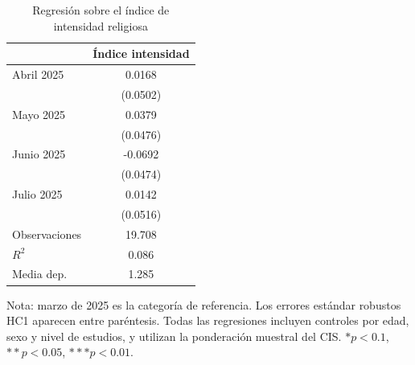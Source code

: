 \begin{table}[H]
\centering
\caption{Regresión sobre el índice de intensidad religiosa}
\label{tab:intensidad-completa}
\small
\begin{tabular}{lc}
\hline
 & Índice intensidad \\
\hline
Abril 2025 & 0.0168 \\
 & (0.0502) \\
Mayo 2025 & 0.0379 \\
 & (0.0476) \\
Junio 2025 & -0.0692 \\
 & (0.0474) \\
Julio 2025 & 0.0142 \\
 & (0.0516) \\
Observaciones & 19.708 \\
$R^2$ & 0.086 \\
Media dep. & 1.285 \\
\hline
\end{tabular}
\begin{flushleft}
\footnotesize Nota: marzo de 2025 es la categoría de referencia. Los errores estándar robustos HC1 aparecen entre paréntesis. Todas las regresiones incluyen controles por edad, sexo y nivel de estudios, y utilizan la ponderación muestral del CIS. $* p<0.1$, $** p<0.05$, $*** p<0.01$.
\end{flushleft}
\end{table}
